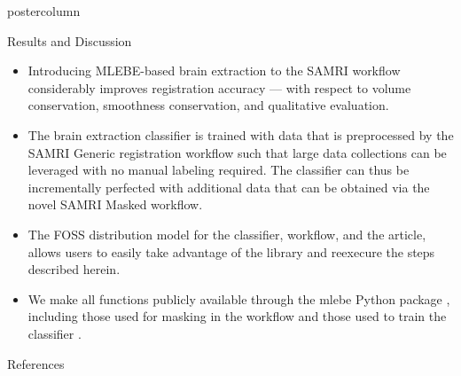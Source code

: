 \begin{frame}
\begin{columns}
\begin{column}{.59\textwidth}
\begin{beamercolorbox}[center]{postercolumn}
\begin{minipage}{.95\textwidth}
{                            \begin{myblock}{Results and Discussion}
                                \begin{itemize}
                                    \item Introducing \textcolor{lg}{MLEBE}-based brain extraction to the SAMRI workflow considerably improves registration accuracy --- with respect to volume conservation, smoothness conservation, and qualitative evaluation.
                                    \item The brain extraction classifier is trained with data that is preprocessed by the SAMRI Generic registration workflow such that large data collections can be leveraged with no manual labeling required.
                                    The classifier can thus be incrementally perfected with additional data that can be obtained via the novel SAMRI Masked workflow.
                                    \item The FOSS distribution model \cite{repsep} for the classifier, workflow, and the article, allows users to easily take advantage of the library and reexecure the steps described herein.
                                    \item We make all functions publicly available through the \textcolor{mg}{mlebe} Python package \cite{mlebe}, including those used for masking in the workflow and those used to train the classifier \cite{mlebe_trainingdata}.

                                \end{itemize}
                            \end{myblock}\vfill

                            \begin{myblock}{References}
                                \vspace{-1em}
                                \begin{multicols}{2}
                                    \scriptsize
                                    
                                    
                                \end{multicols}
                                \vspace{-1em}
                            \end{myblock}\vfill


                        }
                    \end{minipage}
                \end{beamercolorbox}
            \end{column}

        \end{columns}
    \end{frame}

